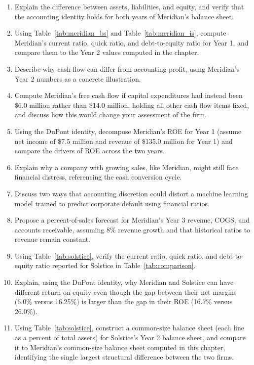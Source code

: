 \documentclass[../ai_in_finance]{subfiles}
\begin{document}
\begin{enumerate}[exercises]
    \item Explain the difference between assets, liabilities, and equity, and verify that the accounting identity holds for both years of Meridian's balance sheet.
    \item Using Table~\ref{tab:meridian_bs} and Table~\ref{tab:meridian_is}, compute Meridian's current ratio, quick ratio, and debt-to-equity ratio for Year 1, and compare them to the Year 2 values computed in the chapter.
    \item Describe why cash flow can differ from accounting profit, using Meridian's Year 2 numbers as a concrete illustration.
    \item Compute Meridian's free cash flow if capital expenditures had instead been \$6.0 million rather than \$14.0 million, holding all other cash flow items fixed, and discuss how this would change your assessment of the firm.
    \item Using the DuPont identity, decompose Meridian's ROE for Year 1 (assume net income of \$7.5 million and revenue of \$135.0 million for Year 1) and compare the drivers of ROE across the two years.
    \item Explain why a company with growing sales, like Meridian, might still face financial distress, referencing the cash conversion cycle.
    \item Discuss two ways that accounting discretion could distort a machine learning model trained to predict corporate default using financial ratios.
    \item Propose a percent-of-sales forecast for Meridian's Year 3 revenue, COGS, and accounts receivable, assuming 8\% revenue growth and that historical ratios to revenue remain constant.
    \item Using Table~\ref{tab:solstice}, verify the current ratio, quick ratio, and debt-to-equity ratio reported for Solstice in Table~\ref{tab:comparison}.
    \item Explain, using the DuPont identity, why Meridian and Solstice can have different return on equity even though the gap between their net margins (6.0\% versus 16.25\%) is larger than the gap in their ROE (16.7\% versus 26.0\%).
    \item Using Table~\ref{tab:solstice}, construct a common-size balance sheet (each line as a percent of total assets) for Solstice's Year 2 balance sheet, and compare it to Meridian's common-size balance sheet computed in this chapter, identifying the single largest structural difference between the two firms.

\end{enumerate}
\end{document}
